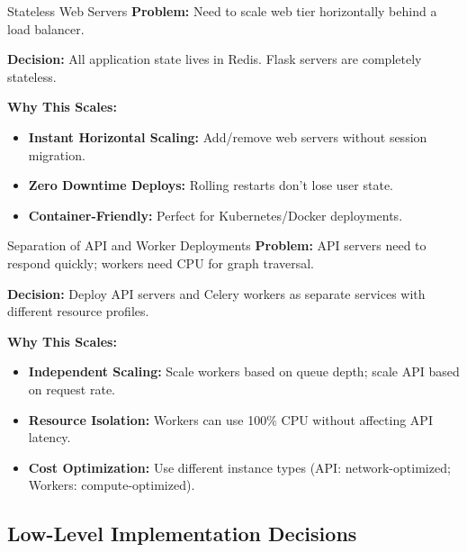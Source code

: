 \documentclass[11pt,a4paper]{article}
\begin{document}
\begin{decisionbox}{Stateless Web Servers}
\textbf{Problem:} Need to scale web tier horizontally behind a load balancer.

\textbf{Decision:} All application state lives in Redis. Flask servers are completely stateless.

\textbf{Why This Scales:}
\begin{itemize}[leftmargin=*, nosep]
    \item \textbf{Instant Horizontal Scaling:} Add/remove web servers without session migration.
    \item \textbf{Zero Downtime Deploys:} Rolling restarts don't lose user state.
    \item \textbf{Container-Friendly:} Perfect for Kubernetes/Docker deployments.
\end{itemize}
\end{decisionbox}

\begin{decisionbox}{Separation of API and Worker Deployments}
\textbf{Problem:} API servers need to respond quickly; workers need CPU for graph traversal.

\textbf{Decision:} Deploy API servers and Celery workers as separate services with different resource profiles.

\textbf{Why This Scales:}
\begin{itemize}[leftmargin=*, nosep]
    \item \textbf{Independent Scaling:} Scale workers based on queue depth; scale API based on request rate.
    \item \textbf{Resource Isolation:} Workers can use 100\% CPU without affecting API latency.
    \item \textbf{Cost Optimization:} Use different instance types (API: network-optimized; Workers: compute-optimized).
\end{itemize}
\end{decisionbox}

\subsection{Low-Level Implementation Decisions}
\end{document}
